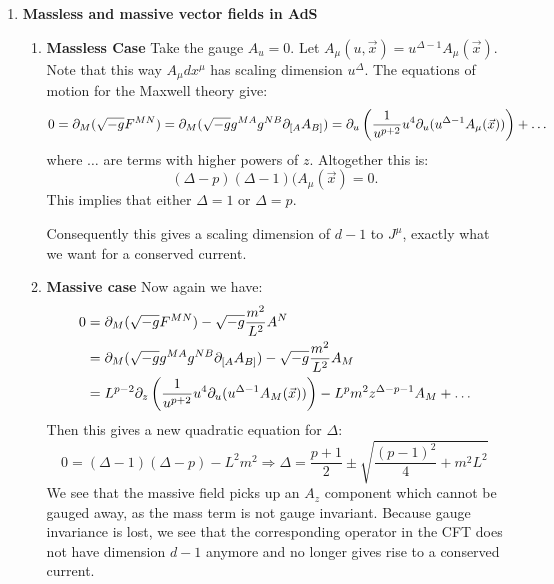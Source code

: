 \documentclass[11pt, class=article, crop=false]{standalone}
\begin{document}
\begin{enumerate}
	\item \textbf{Massless and massive vector fields in AdS}
	\begin{enumerate}
		\item \textbf{Massless Case} Take the gauge $A_u = 0$. Let $A_\mu (u, \vec x) = u^{\Delta - 1} A_\mu (\vec x)$. Note that this way $A_\mu dx^\mu$ has scaling dimension $u^\Delta$. The equations of motion for the Maxwell theory give:
		\[
			0 = \partial_M (\sqrt{-g} F^{MN}) = \partial_M (\sqrt{-g} g^{M A} g^{N B} \partial_{\small[ A} A_{B\small]}) = \partial_{u} \left( \frac{1}{u^{p+2}} u^{4} \partial_{u} (u^{\Delta-1} A_\mu(\vec x)) \right) + \dots
		\]
		 where $\dots$ are terms with higher powers of $z$. Altogether this is:
		 \[
		 	(\Delta - p)(\Delta - 1) (A_\mu (\vec x) = 0.
		 \]
		 This implies that either $\Delta = 1$ or $\Delta = p$.
		 
		
		Consequently this gives a scaling dimension of $d-1$ to $J^\mu$, exactly what we want for a conserved current. 
		
		\item \textbf{Massive case} Now again we have:
		\[
		\begin{aligned}
			0 &= \partial_M (\sqrt{-g} F^{MN}) - \sqrt{-g} \frac{m^2}{L^2} A^N\\
			& = \partial_M (\sqrt{-g} g^{MA} g^{NB} \partial_{\small[ A} A_{B\small]}) - \sqrt{-g} \frac{m^2}{L^2} A_M\\
			& = L^{p-2} \partial_{z} \left( \frac{1}{u^{p+2}} u^{4} \partial_u (u^{\Delta-1} A_M(\vec x)) \right) - L^{p} m^2 z^{\Delta-p-1} A_M + \dots
		\end{aligned}
		\]
		Then this gives a new quadratic equation for $\Delta$:
		\[
			0 = (\Delta - 1) (\Delta - p) - L^2 m^2 \Rightarrow \Delta = \frac{p+1}{2} \pm \sqrt{\frac{(p-1)^2}{4} + m^2 L^2}
		\]
		We see that the massive field picks up an $A_z$ component which cannot be gauged away, as the mass term is not gauge invariant. Because gauge invariance is lost, we see that the corresponding operator in the CFT does not have dimension $d-1$ anymore and no longer gives rise to a conserved current.
		

\end{enumerate}
\end{enumerate}
\end{document}

